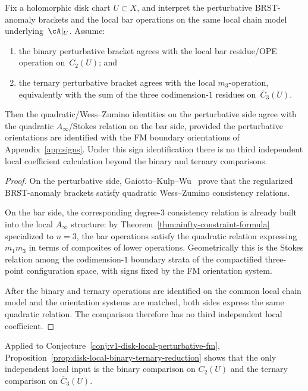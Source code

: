 \begin{proposition}\label{prop:disk-local-binary-ternary-reduction}
Fix a holomorphic disk chart $U \subset X$, and interpret the
perturbative BRST-anomaly brackets and the local bar operations on the
same local chain model underlying~$\cA|_U$.
Assume:
\begin{enumerate}[label=\textup{(\roman*)}]
\item the binary perturbative bracket agrees with the local bar
 residue/OPE operation on~$C_2(U)$; and
\item the ternary perturbative bracket agrees with the local
 $m_3$-operation, equivalently with the sum of the three
 codimension-$1$ residues on~$\overline{C}_3(U)$.
\end{enumerate}
Then the quadratic/Wess--Zumino identities on the perturbative side
agree with the quadratic $A_\infty$/Stokes relation on the bar side,
provided the perturbative orientations are identified with the FM
boundary orientations of Appendix~\ref{app:signs}.  Under this sign
identification there is no third independent local coefficient
calculation beyond the binary and ternary comparisons.
\end{proposition}

\begin{proof}
On the perturbative side, Gaiotto--Kulp--Wu~\cite{GKW24} prove that
the regularized BRST-anomaly brackets satisfy quadratic
Wess--Zumino consistency relations.

On the bar side, the corresponding degree-$3$ consistency relation is
already built into the local $A_\infty$ structure: by
Theorem~\ref{thm:ainfty-constraint-formula} specialized to $n=3$, the
bar operations satisfy the quadratic relation expressing $m_1m_3$ in
terms of composites of lower operations.  Geometrically this is the
Stokes relation among the codimension-$1$ boundary strata of the
compactified three-point configuration space, with signs fixed by the
FM orientation system.

After the binary and ternary operations are identified on the common
local chain model and the orientation systems are matched, both sides
express the same quadratic relation.  The comparison therefore has no
third independent local coefficient.
\end{proof}

\begin{remark}
Applied to Conjecture~\ref{conj:v1-disk-local-perturbative-fm},
Proposition~\ref{prop:disk-local-binary-ternary-reduction} shows that
the only independent local input is the binary comparison on $C_2(U)$
and the ternary comparison on $\overline{C}_3(U)$.
\end{remark}


